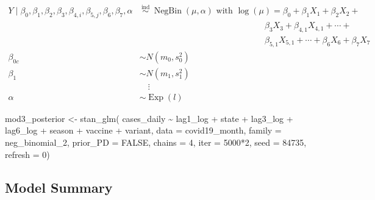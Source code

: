 \documentclass[
]{book}
\newenvironment{Shaded}{\begin{snugshade}}{\end{snugshade}}
\newcommand{\AttributeTok}[1]{\textcolor[rgb]{0.77,0.63,0.00}{#1}}
\newcommand{\ConstantTok}[1]{\textcolor[rgb]{0.00,0.00,0.00}{#1}}
\newcommand{\DecValTok}[1]{\textcolor[rgb]{0.00,0.00,0.81}{#1}}
\newcommand{\FunctionTok}[1]{\textcolor[rgb]{0.00,0.00,0.00}{#1}}
\newcommand{\NormalTok}[1]{#1}
\newcommand{\OtherTok}[1]{\textcolor[rgb]{0.56,0.35,0.01}{#1}}
\newcommand{\SpecialCharTok}[1]{\textcolor[rgb]{0.00,0.00,0.00}{#1}}
\begin{document}
\[
\begin{aligned}
Y \mid \beta_{0}, \beta_{1}, \beta_{2}, \beta_{3}, \beta_{4,i}, \beta_{5,j},\beta_6, \beta_7, \alpha & \stackrel{\text { ind }}{\sim} \operatorname{NegBin}\left(\mu, \alpha\right) \text { with } \log \left(\mu\right)=\beta_{0}+\beta_{1} X_{1}+\beta_{2} X_{2} +\\ &\qquad\qquad\qquad\qquad\qquad\qquad\qquad\text{ }\beta_3X_{3}+\beta_{4,1}X_{4,1} +  \cdots + \\&\qquad\qquad\qquad\qquad\qquad\qquad\qquad\text{ }\beta_{5,1}X_{5,1} + \cdots +\beta_6X_6 + \beta_7X_7\\
\beta_{0 c} & \sim N\left(m_0, s_0^2\right) \\
\beta_{1} & \sim N\left(m_1, s_1^2\right) \\
&\quad\vdots\\
\alpha & \sim \operatorname{Exp}(l)
\end{aligned}
\]

\begin{Shaded}
\begin{Highlighting}[]
\NormalTok{mod3\_posterior }\OtherTok{\textless{}{-}} \FunctionTok{stan\_glm}\NormalTok{(}
\NormalTok{  cases\_daily }\SpecialCharTok{\textasciitilde{}}\NormalTok{ lag1\_log }\SpecialCharTok{+}\NormalTok{ state }\SpecialCharTok{+}\NormalTok{ lag3\_log }\SpecialCharTok{+}\NormalTok{ lag6\_log }\SpecialCharTok{+}\NormalTok{ season }\SpecialCharTok{+}\NormalTok{ vaccine }\SpecialCharTok{+}\NormalTok{ variant, }\AttributeTok{data =}\NormalTok{ covid19\_month,}
  \AttributeTok{family =}\NormalTok{ neg\_binomial\_2,}
  \AttributeTok{prior\_PD =} \ConstantTok{FALSE}\NormalTok{,}
  \AttributeTok{chains =} \DecValTok{4}\NormalTok{, }\AttributeTok{iter =} \DecValTok{5000}\SpecialCharTok{*}\DecValTok{2}\NormalTok{, }\AttributeTok{seed =} \DecValTok{84735}\NormalTok{, }\AttributeTok{refresh =} \DecValTok{0}\NormalTok{)}
\end{Highlighting}
\end{Shaded}

\hypertarget{model-summary-2}{%
\subsection{Model Summary}\label{model-summary-2}}
\end{document}
